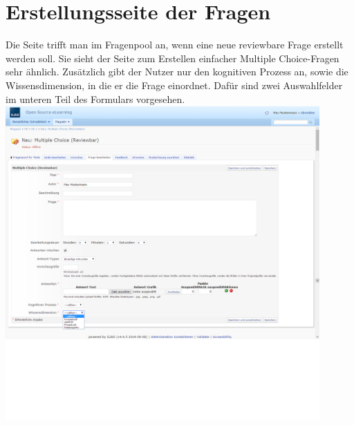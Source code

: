 \documentclass[12pt,a4paper]{scrreprt}
\begin{document}
\section{Erstellungsseite der Fragen}
Die Seite trifft man im Fragenpool an, wenn eine neue reviewbare Frage erstellt werden soll. Sie sieht der Seite zum Erstellen einfacher Multiple Choice-Fragen sehr ähnlich. Zusätzlich gibt der Nutzer nur den kognitiven Prozess an, sowie die Wissensdimension, in die er die Frage einordnet. Dafür sind zwei Auswahlfelder im unteren Teil des Formulars vorgesehen.\\
\includegraphics[width=0.9\textwidth]{frage_erstellen.png}
\\
\end{document}
